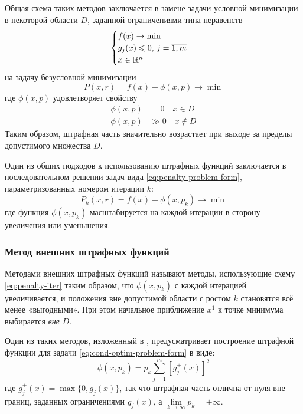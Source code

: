 Общая схема таких методов заключается в замене задачи условной
минимизации в некоторой области $D$, заданной ограничениями типа
неравенств
\begin{equation*}
  \begin{cases}
    f(x) \to \min \\
    g_j(x) \leqslant 0,\, j=\overline{1,m} \\
    x \in \mathbb{R}^n
  \end{cases}
\end{equation*}
на задачу безусловной минимизации
\begin{equation}
  \label{eq:penalty-problem-form}
  P(x, r) = f(x) + \phi(x, p) \to \min
\end{equation}
где  $\phi(x, p)$ удовлетворяет свойству
\begin{align*}
  \phi(x, p) &= 0 \quad x \in D\\
  \phi(x, p) &\gg 0 \quad x \notin D
\end{align*}
Таким образом, штрафная часть значительно возрастает при выходе за
пределы допустимого множества $D$.

Один из общих подходов к использованию штрафных функций заключается в
последовательном решении задач вида \ref{eq:penalty-problem-form},
параметризованных номером итерации $k$:
\begin{equation}
  \label{eq:penalty-iter}
  P_k(x, r) = f(x) + \phi(x, p_k) \to \min  
\end{equation}
где функция $\phi(x, p_k)$ масштабируется на каждой итерации в сторону
увеличения или уменьшения.

\subsubsection{Метод внешних штрафных функций}

Методами внешних штрафных функций называют методы, использующие схему
\eqref{eq:penalty-iter} таким образом, что $\phi(x, p_k)$ с каждой
итерацией увеличивается, и положения вне допустимой области с ростом
$k$ становятся всё менее «выгодными». При этом начальное приближение
$x^1$ к точке минимума выбирается \emph{вне} $D$.

Один из таких методов, изложенный в \cite{himmelblau75},
предусматривает построение штрафной функции для задачи
\eqref{eq:cond-optim-problem-form} в виде:
\begin{equation}
  \label{eq:weisman}
  \phi(x, p_k) = p_k \sum_{j=1}^m{ \left [ g_j^+(x) \right ]^2}
\end{equation}
где $g_j^+(x) = \max\{0, g_j(x)\}$, так что штрафная часть отлична от
нуля вне границ, заданных ограничениями $g_j(x)$, а
$\lim\limits_{k\to\infty}{p_k} = +\infty$.


